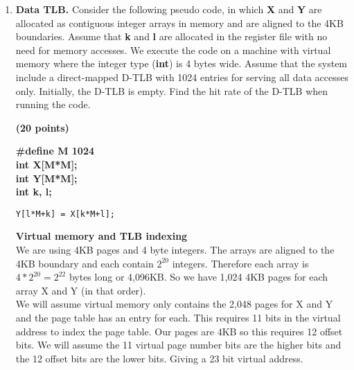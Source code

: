 \documentclass[a4paper, 11pt]{exam}
\begin{document}
\begin{enumerate}

\item \textbf{Data TLB.}
Consider the following  pseudo code, in which \textbf{X} and \textbf{Y} are allocated as contiguous integer arrays in memory and are aligned to the 4KB boundaries.
Assume that \textbf{k} and \textbf{l} are allocated in the register file with no need for memory accesses.
We execute the code on a machine with virtual memory where the integer type (\textbf{int}) is 4 bytes wide.
Assume that the system include a direct-mapped D-TLB with 1024 entries for serving all data accesses only.
Initially, the D-TLB is empty.
Find the hit rate of the D-TLB when running the code.

\textbf{(20 points)}
\begin{algorithm}
	\textbf{\#define M 1024} \\
	\textbf{int X[M*M];} \\
	\textbf{int Y[M*M];} \\
	\textbf{int k, l;}
	\begin{algorithmic}	
		\STATE \texttt{Y[l*M+k] = X[k*M+l];}
		\ENDFOR
		\ENDFOR
	\end{algorithmic}
\end{algorithm}

\textbf{Virtual memory and TLB indexing} \\

We are using 4KB pages and 4 byte integers. The arrays are aligned to the 4KB boundary and each contain $2^{20}$ integers. Therefore each array is $4* 2^{20} = 2^{22}$ bytes long or 4,096KB. So we have 1,024 4KB pages for each array X and Y (in that order). \\

We will assume virtual memory only contains the 2,048 pages for X and Y and the page table has an entry for each. This requires 11 bits in the virtual address to index the page table. Our pages are 4KB so this requires 12 offset bits. We will assume the 11 virtual page number bits are the higher bits and the 12 offset bits are the lower bits. Giving a 23 bit virtual address.


\end{enumerate}
\end{document}
